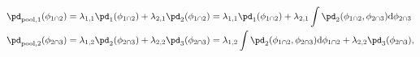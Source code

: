 \begin{align}
  \pd_{\text{pool}, 1}(\phi_{1 \cap 2}) &= \lambda_{1, 1}\pd_{1}(\phi_{1 \cap 2}) + \lambda_{2, 1}\pd_{2}(\phi_{1 \cap 2}) = \lambda_{1, 1}\pd_{1}(\phi_{1 \cap 2}) + \lambda_{2, 1}\int\pd_{2}(\phi_{1 \cap 2}, \phi_{2 \cap 3}) \text{d}\phi_{2 \cap 3} \\
  \pd_{\text{pool}, 2}(\phi_{2 \cap 3}) &= \lambda_{1, 2}\pd_{2}(\phi_{2 \cap 3}) + \lambda_{2, 2}\pd_{3}(\phi_{2 \cap 3}) = \lambda_{1, 2}\int\pd_{2}(\phi_{1 \cap 2}, \phi_{2 \cap 3})\text{d}\phi_{1 \cap 2} + \lambda_{2, 2}\pd_{3}(\phi_{2 \cap 3}),
\end{align}